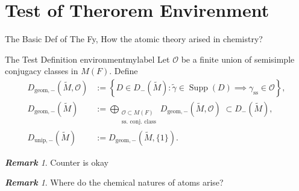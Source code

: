 \documentclass[11pt, a3paper, openany]{article}
\newcommand{\Supp}{\operatorname{Supp}}
\theoremstyle{remark}
\newtheorem{remark}[]{\bfseries Remark}          %
\theoremstyle{remark}
\theoremstyle{remark}
\newenvironment{Proof of claim}
  {\begin{proof}[\normalfont \textbf{Proof of claim}]}
  {\end{proof}}
\begin{document}
\section{Test of Therorem Envirenment}
The Basic Def of The Fy, How the atomic theory arised in chemistry?
\begin{Definition}{The Test Definition environment}{mylabel}
	Let $\mathcal{O}$ be a finite union of semisimple conjugacy classes in $M(F)$. Define
	\begin{align*}
		D_{\mathrm{geom},-}(\tilde{M}, \mathcal{O}) & := \left\{ D \in D_-(\tilde{M}) : \tilde{\gamma} \in \Supp(D) \implies \gamma_{\text{ss}} \in \mathcal{O} \right\}, \\
		D_{\mathrm{geom}, -}(\tilde{M}) & := \bigoplus_{\substack{\mathcal{O} \subset M(F) \\ \text{ss.\ conj.\ class} }} D_{\mathrm{geom},-}(\tilde{M}, \mathcal{O}) \; \subset D_-(\tilde{M}), \\
		D_{\mathrm{unip}, -}(\tilde{M}) & := D_{\mathrm{geom}, -}(\tilde{M}, \{1\}).
	\end{align*}
\end{Definition}
\begin{remark}
Counter is okay
\end{remark}
\begin{remark}
    Where do the chemical natures of atoms arise?
\end{remark}
\end{document}
